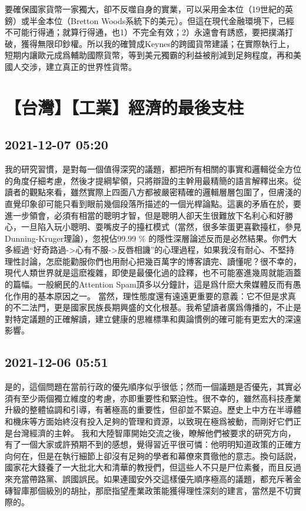 \documentclass[twocolumn]{ctexart}
\begin{document}
要確保國家貨幣一家獨大，卻不反噬自身的實業，可以采用金本位（19世紀的英鎊）或半金本位（Bretton Woods系統下的美元）。但這在現代金融環境下，已經不可能行得通；就算行得通，也1）不完全有效；2）永遠會有誘惑，要把撲滿打破，獲得無限印鈔權。所以我的確贊成Keynes的跨國貨幣建議；在實際執行上，短期内讓歐元成爲輔助國際貨幣，等到美元獨霸的利益被削減到足夠程度，再和美國人交涉，建立真正的世界性貨幣。
\section*{【台灣】【工業】經濟的最後支柱}
\subsection*{2021-12-07 05:20}

我的研究習慣，是對每一個值得深究的議題，都把所有相關的事實和邏輯從全方位的角度仔細考慮，然後才提綱挈領，只將辯證的主幹用最精簡的語言解釋出來。從讀者的觀點來看，雖然實際上四面八方都被嚴密精確的邏輯層層包圍了，但膚淺的直覺印象卻可能只看到眼前幾個段落所描述的一個光桿論點。這裏的矛盾在於，要進一步領會，必須有相當的聰明才智，但是聰明人卻天生很難放下名利心和好勝心，一旦陷入玩小聰明、耍嘴皮子的擡杠模式（當然，很多笨蛋更喜歡擡杠，參見Dunning-Kruger理論），忽視佔99.99 \% 的隱性深層論述反而是必然結果。你們大多經過“好奇路過->心有不服->反唇相譏”的心理過程，如果我沒有耐心、不堅持理性討論，怎麽能勸服你們也用耐心把幾百萬字的博客讀完、讀懂呢？很不幸的，現代人類世界就是這麽複雜，即使是最優化過的詮釋，也不可能塞進幾周就能涵蓋的篇幅。一般網民的Attention Spam頂多以分鐘計，這是爲什麽大衆媒體反而有愚化作用的基本原因之一。
當然，理性態度還有遠遠更重要的意義：它不但是求真的不二法門，更是國家民族長期興盛的文化根基。我希望讀者廣爲傳播的，不止是對特定議題的正確解讀，建立健康的思維標準和輿論慣例的確可能有更宏大的深遠影響。
\subsection*{2021-12-06 05:51}

是的，這個問題在當前行政的優先順序似乎很低；然而一個議題是否優先，其實必須有至少兩個獨立維度的考慮，亦即重要性和緊迫性。很不幸的，雖然高科技產業升級的整體協調和引導，有著極高的重要性，但卻並不緊迫。歷史上中方在半導體和機床等方面始終沒有投入足夠的管理和資源，以致現在極爲被動，而剛好它們正是台灣經濟的主幹。
我和大陸智庫開始交流之後，瞭解他們被要求的研究方向，有了一個大家或許預期不到的感想，覺得習近平很可憐：他明明知道政策的正確方向何在，但是在執行細節上卻沒有足夠的學者和幕僚來貫徹他的意志。換句話説，國家花大錢養了一大批北大和清華的教授們，但這些人不只是尸位素餐，而且反過來充當帶路黨、誤國誤民。如果連國安外交這樣優先順序極高的議題，都充斥著金磚智庫那個級別的胡扯，那麽指望產業政策能獲得理性深刻的建言，當然是不切實際的。
\end{document}
